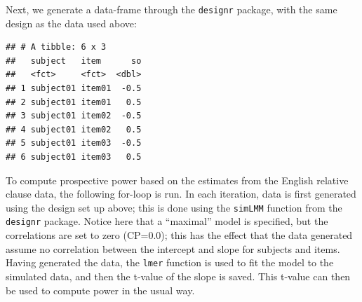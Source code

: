 \documentclass[
  12pt,
]{krantz}
\newenvironment{Shaded}{\begin{snugshade}}{\end{snugshade}}
\newcommand{\AttributeTok}[1]{\textcolor[rgb]{0.77,0.63,0.00}{#1}}
\newcommand{\DecValTok}[1]{\textcolor[rgb]{0.00,0.00,0.81}{#1}}
\newcommand{\DocumentationTok}[1]{\textcolor[rgb]{0.56,0.35,0.01}{\textbf{\textit{#1}}}}
\newcommand{\FunctionTok}[1]{\textcolor[rgb]{0.00,0.00,0.00}{#1}}
\newcommand{\NormalTok}[1]{#1}
\newcommand{\OtherTok}[1]{\textcolor[rgb]{0.56,0.35,0.01}{#1}}
\newcommand{\SpecialCharTok}[1]{\textcolor[rgb]{0.00,0.00,0.00}{#1}}
\newcommand{\StringTok}[1]{\textcolor[rgb]{0.31,0.60,0.02}{#1}}
\theoremstyle{definition}
\theoremstyle{definition}
\theoremstyle{definition}
\theoremstyle{definition}
\theoremstyle{remark}
\begin{document}
Next, we generate a data-frame through the \texttt{designr} package, with the same design as the data used above:

\begin{Shaded}
\end{Shaded}

\begin{verbatim}
## # A tibble: 6 x 3
##   subject   item      so
##   <fct>     <fct>  <dbl>
## 1 subject01 item01  -0.5
## 2 subject01 item01   0.5
## 3 subject01 item02  -0.5
## 4 subject01 item02   0.5
## 5 subject01 item03  -0.5
## 6 subject01 item03   0.5
\end{verbatim}

To compute prospective power based on the estimates from the English relative clause data, the following for-loop is run. In each iteration, data is first generated using the design set up above; this is done using the \texttt{simLMM} function from the \texttt{designr} package. Notice here that a ``maximal'' model is specified, but the correlations are set to zero (CP=0.0); this has the effect that the data generated assume no correlation between the intercept and slope for subjects and items. Having generated the data, the \texttt{lmer} function is used to fit the model to the simulated data, and then the t-value of the slope is saved. This t-value can then be used to compute power in the usual way.
\end{document}
